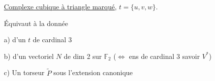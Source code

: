 \uline{Complexe cubique à triangle  marqué}, $t=\{u,v,w\}$.

Équivaut à la donnée

a) d'un  $t$ de cardinal 3

b) d'un vectoriel $N$ de dim 2 sur $\mathbb F_2$ ($\Longleftrightarrow$ ens de cardinal 3 savoir $V^*$)

c) Un torseur $\widetilde P$ sous l'extension canonique
